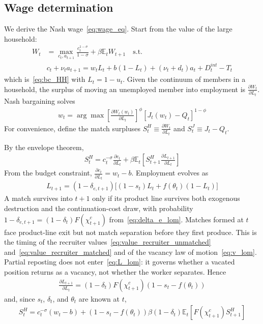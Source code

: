 \documentclass[authoryear, review, 12pt]{elsarticle}
\newcommand{\der}[2]{\frac{\partial #1}{\partial #2}}
\begin{document}
	\subsection{Wage determination}\label{app:wage}
	We derive the Nash wage~\eqref{eq:wage_eq}. Start from the value of the large household:
	\begin{align}
		W_t&=\max_{c_t,a_{t+1}} \frac{c_t^{1-\sigma}}{1-\sigma}+\beta \mathbb{E}_t W_{t+1} \quad \text{s.t.}\\
		&c_t+\nu_ta_{t+1}=w_tL_t+b(1-L_t)+(\nu_t+d_t)a_t+D_t^{int} -T_t
	\end{align}
	which is~\eqref{eq:bc_HH} with $L_t=1-u_t$. Given the continuum of members in a household, the surplus of moving an unemployed member into employment is $\der{W_t}{L_t}$. Nash bargaining solves
	\begin{align}\label{eq:Nash_product}
		w_t=\arg \max \left[\der{W_t(w_t)}{L_t}\right]^{\phi}\left[J_t(w_t)-Q_t\right]^{1-\phi}
	\end{align}
	For convenience, define the match surpluses $S_t^H\equiv\der{W_t}{L_t}$ and $S_t^J\equiv J_t-Q_t$.

	By the envelope theorem,
	\begin{align}\label{eq:HH_envelope}
		S_t^H=c_t^{-\sigma}\der{c_t}{L_t}+\beta \mathbb{E}_t\left[S_{t+1}^H\der{L_{t+1}}{L_t}\right]
	\end{align}
	From the budget constraint, $\der{c_t}{L_t}=w_t-b$. Employment evolves as
	\begin{align}\label{eq:L_lom}
		L_{t+1}=(1-\delta_{e,t+1})\bigl[(1-s_t)L_t+f(\theta_t)(1-L_t)\bigr]
	\end{align}
	A match survives into $t+1$ only if its product line survives both exogenous destruction and the continuation-cost draw, with probability $1-\delta_{e,t+1}=(1-\delta_t)F(\chi_{t+1}^c)$ from~\eqref{eq:delta_e_lom}. Matches formed at $t$ face product-line exit but not match separation before they first produce. This is the timing of the recruiter values~\eqref{eq:value_recruiter_unmatched} and~\eqref{eq:value_recruiter_matched} and of the vacancy law of motion~\eqref{eq:v_lom}. Partial reposting does not enter~\eqref{eq:L_lom}: it governs whether a vacated position returns as a vacancy, not whether the worker separates. Hence
	\begin{align}
		\der{L_{t+1}}{L_t}=(1-\delta_t)F(\chi_{t+1}^c)\left(1-s_t-f(\theta_t)\right)
	\end{align}
	and, since $s_t$, $\delta_t$, and $\theta_t$ are known at $t$,
	\begin{align}\label{eq:SH_bellman}
		S_t^H=c_t^{-\sigma}(w_t-b)+\left(1-s_t-f(\theta_t)\right)\beta(1-\delta_t)\mathbb{E}_t\left[F(\chi_{t+1}^c)S_{t+1}^H\right]
	\end{align}
\end{document}
